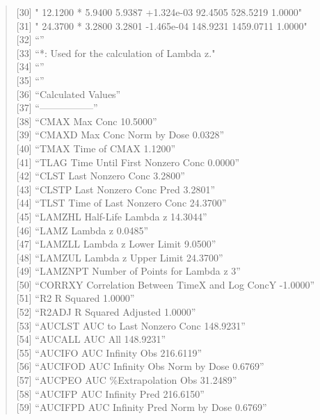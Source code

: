 \documentclass[12pt,]{krantz}
\theoremstyle{definition}
\theoremstyle{definition}
\theoremstyle{definition}
\theoremstyle{remark}
\begin{document}
\begin{quote}
{[}30{]} " 12.1200 * 5.9400 5.9387 +1.324e-03 92.4505 528.5219 1.0000"\\
{[}31{]} " 24.3700 * 3.2800 3.2801 -1.465e-04 148.9231 1459.0711
1.0000"\\
{[}32{]} ``''\\
{[}33{]} ``*: Used for the calculation of Lambda z."\\
{[}34{]} ``''\\
{[}35{]} ``''\\
{[}36{]} ``Calculated Values''\\
{[}37{]} ``-----------------''\\
{[}38{]} ``CMAX Max Conc 10.5000''\\
{[}39{]} ``CMAXD Max Conc Norm by Dose 0.0328''\\
{[}40{]} ``TMAX Time of CMAX 1.1200''\\
{[}41{]} ``TLAG Time Until First Nonzero Conc 0.0000''\\
{[}42{]} ``CLST Last Nonzero Conc 3.2800''\\
{[}43{]} ``CLSTP Last Nonzero Conc Pred 3.2801''\\
{[}44{]} ``TLST Time of Last Nonzero Conc 24.3700''\\
{[}45{]} ``LAMZHL Half-Life Lambda z 14.3044''\\
{[}46{]} ``LAMZ Lambda z 0.0485''\\
{[}47{]} ``LAMZLL Lambda z Lower Limit 9.0500''\\
{[}48{]} ``LAMZUL Lambda z Upper Limit 24.3700''\\
{[}49{]} ``LAMZNPT Number of Points for Lambda z 3''\\
{[}50{]} ``CORRXY Correlation Between TimeX and Log ConcY -1.0000''\\
{[}51{]} ``R2 R Squared 1.0000''\\
{[}52{]} ``R2ADJ R Squared Adjusted 1.0000''\\
{[}53{]} ``AUCLST AUC to Last Nonzero Conc 148.9231''\\
{[}54{]} ``AUCALL AUC All 148.9231''\\
{[}55{]} ``AUCIFO AUC Infinity Obs 216.6119''\\
{[}56{]} ``AUCIFOD AUC Infinity Obs Norm by Dose 0.6769''\\
{[}57{]} ``AUCPEO AUC \%Extrapolation Obs 31.2489''\\
{[}58{]} ``AUCIFP AUC Infinity Pred 216.6150''\\
{[}59{]} ``AUCIFPD AUC Infinity Pred Norm by Dose 0.6769''\\

\end{quote}
\end{document}
